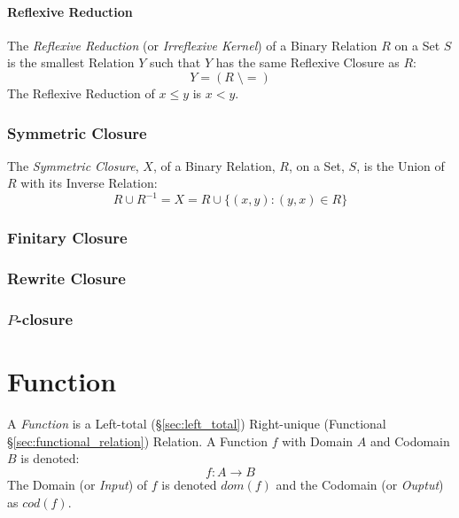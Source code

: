 \paragraph{Reflexive Reduction}\label{sec:reflexive_reduction}\hfill

The \emph{Reflexive Reduction} (or \emph{Irreflexive Kernel}) of a
Binary Relation $R$ on a Set $S$ is the smallest Relation $Y$ such
that $Y$ has the same Reflexive Closure as $R$:
\[
  Y = (R\;\setminus=)
\]
The Reflexive Reduction of $x \leq y$ is $x < y$.



\subsubsection{Symmetric Closure}\label{sec:symmetric_closure}

The \emph{Symmetric Closure}, $X$, of a Binary Relation, $R$, on a
Set, $S$, is the Union of $R$ with its Inverse Relation:
\[
  R \cup R^{-1} = X = R \cup \{(x,y) : (y,x) \in R\}
\]



\subsubsection{Finitary Closure}\label{sec:finitary_closure}

\subsubsection{Rewrite Closure}\label{sec:rewrite_closure}

\subsubsection{$P$-closure}\label{sec:p_closure}



\section{Function}\label{sec:set_function}

A \emph{Function} is a Left-total (\S\ref{sec:left_total})
Right-unique (Functional \S\ref{sec:functional_relation}) Relation. A
Function $f$ with Domain $A$ and Codomain $B$ is denoted:
\[
  f : A \rightarrow B
\]
The Domain (or \emph{Input}) of $f$ is denoted $dom(f)$ and the
Codomain (or \emph{Ouptut}) as $cod(f)$.

